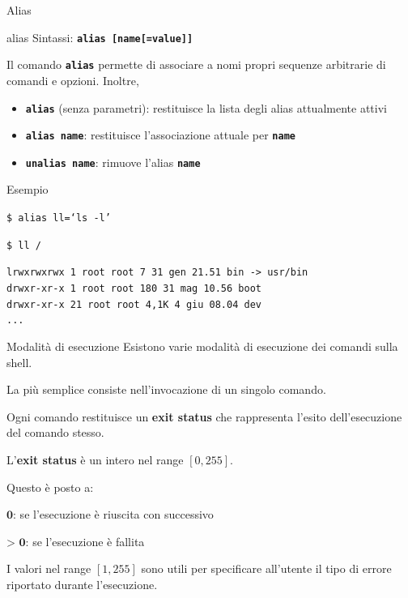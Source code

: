 \documentclass{beamer}
\begin{document}
    \begin{frame}{Alias}
        \begin{block}{alias}
            \small
            Sintassi: \texttt{\textbf{alias [name[=value]]}}

            Il comando \texttt{\textbf{alias}} permette di associare a nomi propri sequenze arbitrarie
            di comandi e opzioni. Inoltre,

            \begin{itemize}
                \item \texttt{\textbf{alias}} (senza parametri): restituisce la lista degli alias attualmente attivi
                \item \texttt{\textbf{alias name}}: restituisce l'associazione attuale per \texttt{\textbf{name}}
                \item \texttt{\textbf{unalias name}}: rimuove l'alias \texttt{\textbf{name}}
            \end{itemize}
        \end{block}

        \begin{exampleblock}{Esempio}
            \scriptsize

            \texttt{\$ alias ll=`ls -l'}
            
            \texttt{\$ ll /}

            \texttt{lrwxrwxrwx   1 root root    7 31 gen 21.51 bin -> usr/bin \\
            drwxr-xr-x   1 root root  180 31 mag 10.56 boot \\
            drwxr-xr-x  21 root root 4,1K  4 giu 08.04 dev \\
            ...
            }
        \end{exampleblock}
    \end{frame}

    \begin{frame}{Modalità di esecuzione}
        Esistono varie modalità di esecuzione dei comandi sulla shell.
        
        La più semplice consiste nell'invocazione di un singolo comando.

        Ogni comando restituisce un \textbf{exit status} che
        rappresenta l'esito dell'esecuzione del comando stesso.

        \vspace{0.5cm}

        L'\textbf{exit status} è un intero nel range $[0,255]$.
        
        Questo è posto a:
        
        \hspace{1cm} $\textbf{0}$: se l'esecuzione è riuscita con successivo

        \hspace{1cm} $\textbf{> 0}$: se l'esecuzione è fallita

        \vspace{0.5cm}

        I valori nel range $[1,255]$ sono utili per specificare all'utente il tipo di errore
        riportato durante l'esecuzione.
    \end{frame}
\end{document}
